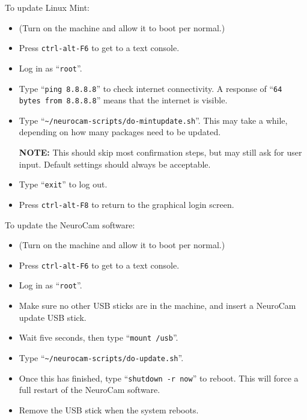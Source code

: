 To update Linux Mint:
\begin{itemize}
%
\item (Turn on the machine and allow it to boot per normal.)
\item Press \verb+ctrl-alt-F6+ to get to a text console.
\item Log in as ``\verb+root+''.
\item Type ``\verb+ping 8.8.8.8+'' to check internet connectivity. A response
of ``\verb+64 bytes from 8.8.8.8+'' means that the internet is visible.
\item Type ``\verb+~/neurocam-scripts/do-mintupdate.sh+''. This may take a
while, depending on how many packages need to be updated.
\par
\textbf{NOTE:} This should skip most confirmation steps, but may still ask for
user input. Default settings should always be acceptable.
\item Type ``\verb+exit+'' to log out.
\item Press \verb+ctrl-alt-F8+ to return to the graphical login screen.
\end{itemize}

To update the NeuroCam software:
\begin{itemize}
%
\item (Turn on the machine and allow it to boot per normal.)
\item Press \verb+ctrl-alt-F6+ to get to a text console.
\item Log in as ``\verb+root+''.
\item Make sure no other USB sticks are in the machine, and insert a
NeuroCam update USB stick.
\item Wait five seconds, then type ``\verb+mount /usb+''.
\item Type ``\verb+~/neurocam-scripts/do-update.sh+''.
\item Once this has finished, type ``\verb+shutdown -r now+'' to reboot.
This will force a full restart of the NeuroCam software.
\item Remove the USB stick when the system reboots.
%
\end{itemize}

